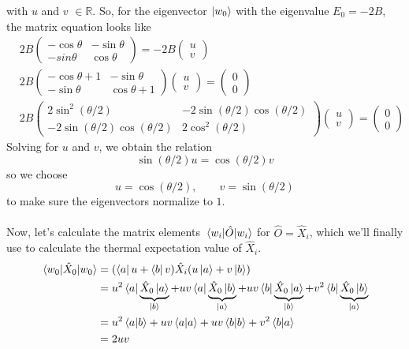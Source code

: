 \documentclass[../journal_main.tex]{subfiles}
\begin{document}
with $u$ and $v$ $\in \mathbb{R}$. So, for the eigenvector $\ket{w_0}$  with the eigenvalue $E_0 = -2B$, the matrix equation looks like
\begin{align*}
    & 2B \left(\begin{array}{cc}
    -\cos \theta  & -\sin \theta  \\ 
    -sin \theta  & \cos \theta 
    \end{array}\right) = -2B 
    \left(\begin{array}{c}
    u \\ 
    v
    \end{array}\right) \\
    & 2B \left(\begin{array}{cc}
    -\cos \theta +1 & -\sin \theta  \\ 
    - \sin \theta  & \cos \theta + 1
    \end{array}\right)
    \left(\begin{array}{c}
    u \\ 
    v
    \end{array}\right) = 
    \left(\begin{array}{c}
    0 \\ 
    0
    \end{array}\right) \\
    & 2B \left(\begin{array}{cc}
    2 \sin^2(\theta/2) & -2\sin(\theta /2) \cos(\theta /2) \\ 
    -2 \sin(\theta /2) \cos(\theta /2) & 2 \cos^2(\theta /2)
    \end{array}\right) 
    \left(\begin{array}{c}
    u \\ 
    v
    \end{array}\right) = 
    \left(\begin{array}{c}
    0 \\ 
    0
    \end{array}\right)
\end{align*}
Solving for $u$ and $v$, we obtain the relation 
\[
    \sin (\theta /2) u = \cos (\theta /2) v
\]   
so we choose 
\[
    \boxed{u = \cos(\theta /2), \qquad v = \sin (\theta /2)}
\]
to make sure the eigenvectors normalize to $1$.~\\~\\
Now, let's calculate the matrix elements $\mel{w_i}{\hat{O}}{w_i}$ for $\hat{O} = \hat{X}_i$, which we'll finally use to calculate the thermal expectation value of $\hat{X}_i$.
\begin{align*}
    \mel{w_0}{\hat{X}_0}{w_0} & = (\bra{a} u + \bra{b} v) \hat{X}_i (u \ket{a} + v \ket{b}) \\
    & = u^2 \bra{a}\underbrace{{\hat{X}_0}\ket{a}}_{\ket{b}} +  uv \bra{a}\underbrace{{\hat{X}_0}\ket{b}}_{\ket{a}} + uv \bra{b}\underbrace{{\hat{X}_0}\ket{a}}_{\ket{b}} + v^2 \bra{b}\underbrace{{\hat{X}_0}\ket{b}}_{\ket{a}} \\ 
    & = u^2 \braket{a}{b} + uv \braket{a}{a} + uv \braket{b}{b} + v^2\braket{b}{a} \\
    & = 2uv
\end{align*} 
\end{document}
